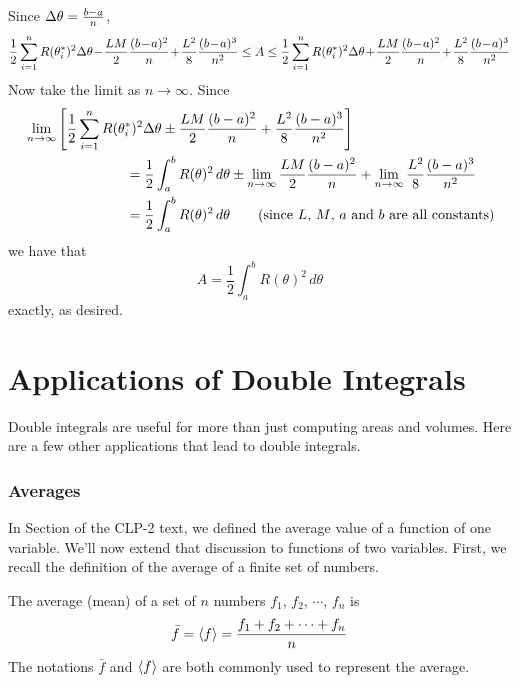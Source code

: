 Since $\Delta \theta=\frac{b-a}{n}$,
\begin{align*}
\frac{1}{2}\sum_{i=1}^n R(\theta_i^*)^2\De\theta 
\!-\! \frac{ L M}{2}\frac{(b\!-\!a)^2}{n} 
\!+\!\frac{L^2}{8} \frac{(b\!-\!a)^3}{n^2}
\le A
\le \frac{1}{2}\sum_{i=1}^n R(\theta_i^*)^2\De\theta 
   \!+\! \frac{ L M}{2}\frac{(b\!-\!a)^2}{n} 
   \!+\! \frac{L^2}{8} \frac{(b\!-\!a)^3}{n^2}
\end{align*}
Now take the limit as $n\rightarrow\infty$. Since
\begin{align*}
&\lim_{n\rightarrow\infty}\left[
   \frac{1}{2}\sum_{i=1}^n R(\theta_i^*)^2\Delta\theta 
   \pm \frac{ L M}{2}\frac{(b-a)^2}{n} 
   +\frac{L^2}{8} \frac{(b-a)^3}{n^2}\right]
\cr
&\hskip1in=\frac{1}{2}\int_a^b R(\theta)^2\,d\theta
\pm \lim_{n\rightarrow\infty}\frac{ L M}{2}\frac{(b-a)^2}{n}
+\lim_{n\rightarrow\infty}\frac{L^2}{8} \frac{(b-a)^3}{n^2}\\
&\hskip1in=\frac{1}{2}\int_a^b R(\theta)^2\,d\theta \qquad
\text{(since $L$, $M$, $a$ and $b$ are all constants)} 
\end{align*}
we have that
\begin{equation*}
A=\frac{1}{2}\int_a^b R(\theta)^2\,d\theta
\end{equation*}
exactly, as desired.

\goodbreak
\section{Applications of Double Integrals}
\label{sec int 2d applications}

Double integrals are useful for more than just computing
areas and volumes. Here are a few other applications that
lead to double integrals. 

\subsubsection{Averages}

In Section  of the CLP-2 text, we defined
the average value of a function of one variable. We'll now extend that
discussion to functions of two variables. First, we recall the
definition of the average of a finite set of numbers.

\begin{defn}\label{def avg}
 The average (mean) of a set of $n$ numbers $f_1$, $f_2$, $\cdots$, $f_n$ is
\begin{align*}
\bar f = \left< f\right> =\frac{f_1+f_2+\cdots+f_n}{n}
\end{align*}
The notations $\bar f$ and $\left< f\right>$ are both commonly used
to represent the average.
\end{defn}


